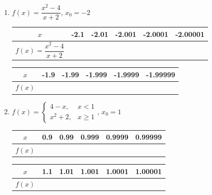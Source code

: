 \documentclass[12pt]{report}
\begin{document}
\begin{enumerate}
\begin{enumerate}
          \item $f(x) = \dfrac{x^2 - 4}{x + 2}$, $x_0 = -2$
                \begin{center}
                  \begin{tabular}{|c|c|c|c|c|c|}
                    \hline
                    $x$                             & -2.1 & -2.01 & -2.001 & -2.0001 & -2.00001 \\
                    \hline
                    $f(x) = \dfrac{x^2 - 4}{x + 2}$ &      &       &        &         &          \\
                    \hline
                  \end{tabular}
                  \vskip 0.2cm
                  \begin{tabular}{|c|c|c|c|c|c|}
                    \hline
                    $x$    & -1.9 & -1.99 & -1.999 & -1.9999 & -1.99999 \\
                    \hline
                    $f(x)$ &      &       &        &         &          \\
                    \hline
                  \end{tabular}
                \end{center}

          \item $f(x) = \left\{\begin{array}{rl}
                    4 - x,   & x < 1    \\
                    x^2 + 2, & x \geq 1
                  \end{array}\right.$, $x_0 = 1$
                \begin{center}
                  \begin{tabular}{|c|c|c|c|c|c|}
                    \hline
                    $x$    & 0.9 & 0.99 & 0.999 & 0.9999 & 0.99999 \\
                    \hline
                    $f(x)$ &     &      &       &        &         \\
                    \hline
                  \end{tabular}
                  \vskip 0.2cm
                  \begin{tabular}{|c|c|c|c|c|c|}
                    \hline
                    $x$    & 1.1 & 1.01 & 1.001 & 1.0001 & 1.00001 \\
                    \hline
                    $f(x)$ &     &      &       &        &         \\
                    \hline
                  \end{tabular}
                \end{center}
        \end{enumerate}


\end{enumerate}
\end{document}
